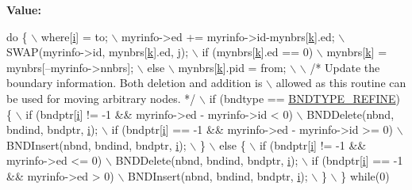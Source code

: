 {\bfseries Value\+:}
\begin{DoxyCode}
\textcolor{keywordflow}{do} \{ \(\backslash\)
     where[\hyperlink{a01014_afb6aca53df96564f2adf086c942453ec}{i}] = to; \(\backslash\)
     myrinfo->ed += myrinfo->id-mynbrs[\hyperlink{a00563_a1c73327b2882639bc9f5e416bb3cc7ac}{k}].ed; \(\backslash\)
     SWAP(myrinfo->id, mynbrs[\hyperlink{a00563_a1c73327b2882639bc9f5e416bb3cc7ac}{k}].ed, \hyperlink{a01014_ac86694252f8dfdb19aaeadc4b7c342c6}{j}); \(\backslash\)
     if (mynbrs[\hyperlink{a00563_a1c73327b2882639bc9f5e416bb3cc7ac}{k}].ed == 0) \(\backslash\)
       mynbrs[\hyperlink{a00563_a1c73327b2882639bc9f5e416bb3cc7ac}{k}] = mynbrs[--myrinfo->nnbrs]; \(\backslash\)
     else \(\backslash\)
       mynbrs[\hyperlink{a00563_a1c73327b2882639bc9f5e416bb3cc7ac}{k}].pid = from; \(\backslash\)
     \(\backslash\)
     \textcolor{comment}{/* Update the boundary information. Both deletion and addition is \(\backslash\)}
\textcolor{comment}{        allowed as this routine can be used for moving arbitrary nodes. */} \(\backslash\)
     if (bndtype == \hyperlink{a00888_a233ac25cf2dac8a634c2e40902bb90dc}{BNDTYPE\_REFINE}) \{ \(\backslash\)
       if (bndptr[\hyperlink{a01014_afb6aca53df96564f2adf086c942453ec}{i}] != -1 && myrinfo->ed - myrinfo->id < 0) \(\backslash\)
         BNDDelete(nbnd, bndind, bndptr, \hyperlink{a01014_afb6aca53df96564f2adf086c942453ec}{i}); \(\backslash\)
       if (bndptr[\hyperlink{a01014_afb6aca53df96564f2adf086c942453ec}{i}] == -1 && myrinfo->ed - myrinfo->id >= 0) \(\backslash\)
         BNDInsert(nbnd, bndind, bndptr, \hyperlink{a01014_afb6aca53df96564f2adf086c942453ec}{i}); \(\backslash\)
     \} \(\backslash\)
     else \{ \(\backslash\)
       if (bndptr[\hyperlink{a01014_afb6aca53df96564f2adf086c942453ec}{i}] != -1 && myrinfo->ed <= 0) \(\backslash\)
         BNDDelete(nbnd, bndind, bndptr, \hyperlink{a01014_afb6aca53df96564f2adf086c942453ec}{i}); \(\backslash\)
       if (bndptr[\hyperlink{a01014_afb6aca53df96564f2adf086c942453ec}{i}] == -1 && myrinfo->ed > 0) \(\backslash\)
         BNDInsert(nbnd, bndind, bndptr, \hyperlink{a01014_afb6aca53df96564f2adf086c942453ec}{i}); \(\backslash\)
     \} \(\backslash\)
   \} \textcolor{keywordflow}{while}(0)
\end{DoxyCode}
\mbox{\label{a00921_af7766ae41587b123ec2039322f71c2a6}} 
